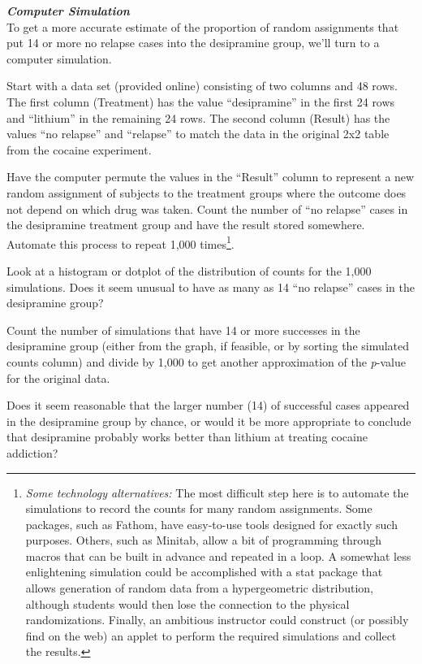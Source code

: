 \noindent\textbf{\textit{Computer Simulation}}\\
\vspace{3pt}
To get a more accurate estimate of the proportion of random assignments that put 14 or more no relapse cases into the desipramine group, we'll turn to a computer simulation. 

Start with a data set (provided online) consisting of two columns and 48 rows.  The first column (Treatment) has the value ``desipramine'' in the first 24 rows and ``lithium'' in the remaining 24 rows.  The second column (Result) has the values ``no relapse'' and ``relapse'' to match the data in the original 2x2 table from the cocaine experiment. 

Have the computer permute the values in the ``Result'' column to represent a new random assignment of subjects to the treatment groups where the outcome does not depend on which drug was taken.  Count the number of ``no relapse'' cases in the desipramine treatment group and have the result stored somewhere.   Automate this process to repeat 1,000 times\footnote{\textit{Some technology alternatives:} The most difficult step here is to automate the simulations to record the counts for many random assignments.  Some packages, such as Fathom, have easy-to-use tools designed for exactly such purposes.  Others, such as Minitab, allow a bit of programming through macros that can be built in advance and repeated in a loop.  A somewhat less enlightening simulation could be accomplished with a stat package that allows generation of random data from a hypergeometric distribution, although students would then lose the connection to the physical randomizations.  Finally, an ambitious instructor could construct (or possibly find on the web) an applet to perform the required simulations and collect the results.}. 

Look at a histogram or dotplot of the distribution of counts for the 1,000 simulations.  Does it seem unusual to have as many as 14 ``no relapse'' cases in the desipramine group? 

Count the number of simulations that have 14 or more successes in the desipramine group (either from the graph, if feasible, or by sorting the simulated counts column) and divide by 1,000 to get another approximation of the \textit{p}-value for the original data.  

Does it seem reasonable that the larger number (14) of successful cases appeared in the desipramine group by chance, or would it be more appropriate to conclude that desipramine probably works better than lithium at treating cocaine addiction? 
